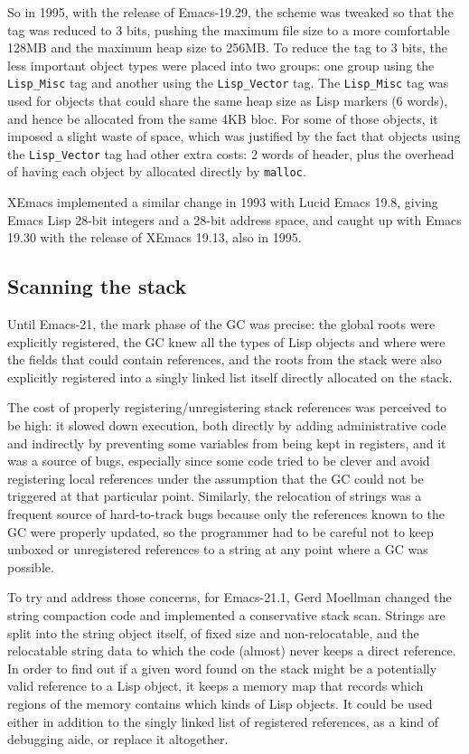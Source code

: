 \documentclass[format=acmsmall, review=false, screen=true]{acmart}
\begin{document}
So in 1995, with the release of Emacs-19.29,
the scheme was tweaked so that the tag was reduced to
3 bits, pushing the maximum file size to a more comfortable 128MB and the
maximum heap size to 256MB.  To reduce the tag to 3 bits, the less important
object types were placed into two groups: one group using the
\texttt{Lisp\_Misc} tag and another using the \texttt{Lisp\_Vector} tag.
The \texttt{Lisp\_Misc} tag was used for objects that could share the same
heap size as Lisp markers (6 words), and hence be allocated from the same
4KB bloc.  For some of those objects, it imposed a slight waste of space,
which was justified by the fact that objects using the \texttt{Lisp\_Vector}
tag had other extra costs: 2 words of header, plus the overhead of having
each object by allocated directly by \texttt{malloc}.

XEmacs implemented a similar change in 1993 with Lucid Emacs 19.8,
giving Emacs Lisp 28-bit integers and a 28-bit address space, and
caught up with Emacs 19.30 with the release of XEmacs 19.13, also in
1995.

\subsection{Scanning the stack}
Until Emacs-21, the mark phase of the GC was precise: the global roots were
explicitly registered, the GC knew all the types of Lisp objects and where
were the fields that could contain references, and the roots from the stack
were also explicitly registered into a singly linked list itself directly
allocated on the stack.

The cost of properly registering/unregistering stack references was
perceived to be high: it slowed down execution, both directly by adding
administrative code and indirectly by preventing some variables from being
kept in registers, and it was a source of bugs, especially since some code
tried to be clever and avoid registering local references under the
assumption that the GC could not be triggered at that particular point.
Similarly, the relocation of strings was a frequent source of hard-to-track
bugs because only the references known to the GC were properly updated, so
the programmer had to be careful not to keep unboxed or unregistered
references to a string at any point where a GC was possible.

To try and address those concerns, for Emacs-21.1, Gerd
Moellman changed the string compaction code and implemented a conservative
stack scan.  Strings are split into the string object itself, of fixed size
and non-relocatable, and the relocatable string data to which the code
(almost) never keeps a direct reference.  In order to find out if a given
word found on the stack might be a potentially valid reference to a Lisp
object, it keeps a memory map that records which regions of the memory
contains which kinds of Lisp objects.  It could be used either in addition
to the singly linked list of registered references, as a kind of debugging
aide, or replace it altogether.
\end{document}

